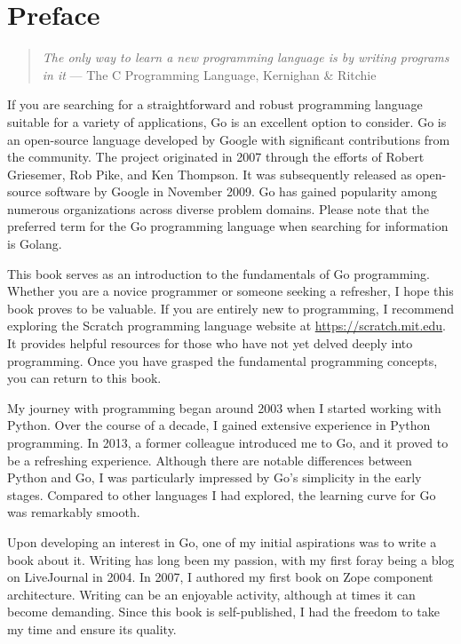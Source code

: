 \cleardoublepage
{}
\chapter*{Preface}

\begin{quote}
\textit{The only way to learn a new programming language is by writing programs in it}
--- The C Programming Language, Kernighan \& Ritchie
\end{quote}

If you are searching for a straightforward and robust programming language
suitable for a variety of applications, Go is an excellent option to consider.
Go is an open-source language developed by Google with significant contributions
from the community. The project originated in 2007 through the efforts of Robert
Griesemer, Rob Pike, and Ken Thompson. It was subsequently released as
open-source software by Google in November 2009. Go has gained popularity among
numerous organizations across diverse problem domains. Please note that the
preferred term for the Go programming language when searching for information is
Golang.

This book serves as an introduction to the fundamentals of Go programming.
Whether you are a novice programmer or someone seeking a refresher, I hope this
book proves to be valuable. If you are entirely new to programming, I recommend
exploring the Scratch programming language website
at \url{https://scratch.mit.edu}. It provides helpful resources for those who
have not yet delved deeply into programming. Once you have grasped the
fundamental programming concepts, you can return to this book.

My journey with programming began around 2003 when I started working with
Python. Over the course of a decade, I gained extensive experience in Python
programming. In 2013, a former colleague introduced me to Go, and it proved to
be a refreshing experience. Although there are notable differences between
Python and Go, I was particularly impressed by Go's simplicity in the early
stages. Compared to other languages I had explored, the learning curve for Go
was remarkably smooth.

Upon developing an interest in Go, one of my initial aspirations was to write a
book about it. Writing has long been my passion, with my first foray being a
blog on LiveJournal in 2004. In 2007, I authored my first book on Zope component
architecture. Writing can be an enjoyable activity, although at times it can
become demanding. Since this book is self-published, I had the freedom to take
my time and ensure its quality.

